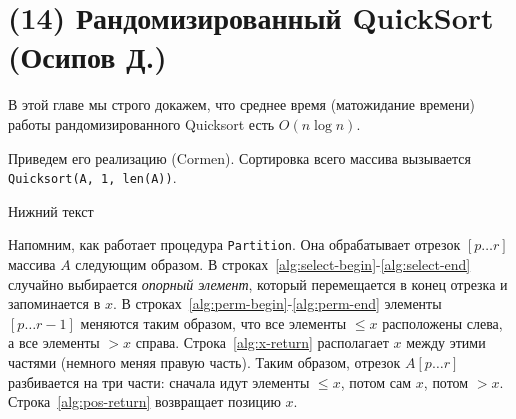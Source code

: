 \section{(14) Рандомизированный QuickSort (Осипов Д.)}

В этой главе мы строго докажем, что среднее время (матожидание времени) работы рандомизированного Quicksort есть $O(n\log n)$.

Приведем его реализацию (Cormen). Сортировка всего массива вызывается \texttt{Quicksort(A, 1, len(A))}.

\begin{algorithm}[H]
	\caption{Нижний текст}
	\DontPrintSemicolon
	\;
\end{algorithm}


Напомним, как работает процедура \texttt{Partition}. Она обрабатывает отрезок $[p\ldots r]$ массива $A$ следующим образом.  В строках~\ref{alg:select-begin}-\ref{alg:select-end} случайно выбирается \textit{опорный элемент}, который перемещается в конец отрезка и запоминается в $x$. В строках~\ref{alg:perm-begin}-\ref{alg:perm-end} элементы $[p\ldots r-1]$ меняются таким образом, что все элементы $\leq x$ расположены слева, а все элементы $> x$ справа. Строка~\ref{alg:x-return} располагает $x$ между этими частями (немного меняя правую часть). Таким образом, отрезок $A[p\ldots r]$ разбивается на три части: сначала идут элементы $\leq x$, потом сам $x$, потом $>x$. Строка~\ref{alg:pos-return} возвращает позицию $x$.


